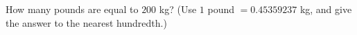 How many pounds are equal to $200$ kg? (Use $1$ pound $=0.45359237$ kg, and give the answer to the nearest hundredth.)
